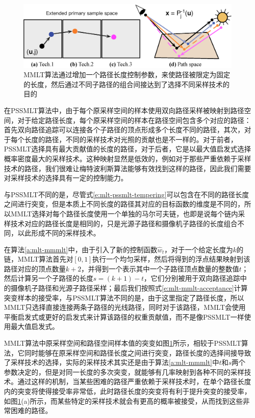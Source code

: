 \begin{figure}
	\includegraphics[width=1.0\textwidth]{figures/mlt/mmlt}
	\caption{MMLT算法通过增加一个路径长度控制参数，来使路径被限定为固定的长度，然后通过不同子路径的组合间接达到了选择不同采样技术的目的}
	\label{f:mlt-mmlt}
\end{figure}

在PSSMLT算法中，由于每个原采样空间的样本使用双向路径采样被映射到路径空间，对于给定路径长度，每个原采样空间的样本在路径空间包含多个对应的路径：首先双向路径追踪可以连接各个子路径的顶点形成多个长度不同的路径，其次，对于每个长度的路径，不同的采样技术对光照的贡献也是不一样的。对于前者，PSSMLT选择具有最大贡献值的长度的路径，对于后者，它是以最大值启发式选择概率密度最大的采样技术。这种映射显然是低效的，例如对于那些严重依赖于采样技术的路径，我们很难让梅特波利斯算法能够有效找到这样的路径，因此我们需要对采样技术的选择具有一定的控制能力。

与PSSMLT不同的是，尽管式\ref{e:mlt-pssmlt-tempering}可以包含在不同的路径长度之间进行突变，但是本质上不同长度的路径其对应的目标函数的维度是不同的，所以MMLT选择对每个路径长度使用一个单独的马尔可夫链，也即是说每个链内采样技术对应的路径长度是相同的，只是光源子路径和摄像机子路径的长度组合不同，以此形成不同的采样技术。

在算法\ref{a:mlt-mmmlt}中，由于引入了新的控制函数$\hat{w}_t$，对于一个给定长度为$k$的链，MMLT算法首先对$[0,1]$执行一个均匀采样，然后将得到的浮点结果映射到该路径对应的顶点数量$k+2$，并得到一个表示其中一个子路径顶点数量的整数值$t$；然后计算另一个子路径的长度$s=(k+1)-t$，它们分别被用于双向路径追踪中的摄像机子路径和光源子路径采样；最后我们按照式\ref{e:mlt-mmlt-acceptance}计算突变样本的接受率，与PSSMLT算法不同的是，由于这里指定了路径长度，所以MMLT只选择直接连接两条子路径的光线路径，同时对于该路径，MMLT会使用平衡启发式或更好的启发式来计算该路径的权重贡献值，而不是像PSSMLT一样使用最大值启发式。

MMLT算法\cite{m:MMLT}中原采样空间和路径空间样本值的突变如图\ref{f:mlt-mmlt}所示，相较于PSSMLT算法，它同时能够在原采样空间和路径长度之间进行突变，路径长度的选择间接导致了采样技术的选择，实际的采样技术其实还是由于算法\ref{a:mlt-mmmlt}中$t$和$s$两个参数决定的，但是对同一长度的多次突变，就能够有几率映射到各种不同的采样技术。通过这样的机制，当某些困难的路径严重依赖于采样技术时，在单个路径长度内的突变将使得接受率非常低，此时路径长度的突变将有利于提升突变的接受率，如图\ref{f:mlt-mmlt}(a)所示，而某些特定的采样技术就会有更高的概率被接受，从而找到这些非常困难的路径。






